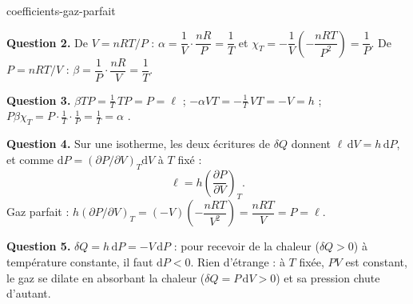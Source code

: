 \begin{exo}{coefficients-gaz-parfait}
\begin{solution}
\textbf{Question 2.} De $V = nRT/P$ : $\alpha = \dfrac{1}{V}\cdot\dfrac{nR}{P} = \dfrac{1}{T}$ et $\chi_T = -\dfrac{1}{V}\left(-\dfrac{nRT}{P^2}\right) = \dfrac{1}{P}$. De $P = nRT/V$ : $\beta = \dfrac{1}{P}\cdot\dfrac{nR}{V} = \dfrac{1}{T}$.

\textbf{Question 3.} $\beta TP = \frac{1}{T}\,TP = P = \ell$ \checkmark ; $-\alpha VT = -\frac{1}{T}\,VT = -V = h$ \checkmark ; $P\beta\chi_T = P\cdot\frac{1}{T}\cdot\frac{1}{P} = \frac{1}{T} = \alpha$ \checkmark.

\textbf{Question 4.} Sur une isotherme, les deux écritures de $\delta Q$ donnent $\ell\,\mathrm{d}V = h\,\mathrm{d}P$, et comme $\mathrm{d}P = \left(\partial P/\partial V\right)_T\mathrm{d}V$ à $T$ fixé :
\[
\ell = h\left(\frac{\partial P}{\partial V}\right)_T.
\]
Gaz parfait : $h\left(\partial P/\partial V\right)_T = (-V)\left(-\dfrac{nRT}{V^2}\right) = \dfrac{nRT}{V} = P = \ell$. \checkmark

\textbf{Question 5.} $\delta Q = h\,\mathrm{d}P = -V\,\mathrm{d}P$ : pour recevoir de la chaleur ($\delta Q > 0$) à température constante, il faut $\mathrm{d}P < 0$. Rien d'étrange : à $T$ fixée, $PV$ est constant, le gaz se dilate en absorbant la chaleur ($\delta Q = P\,\mathrm{d}V > 0$) et sa pression chute d'autant.
\end{solution}
\end{exo}

